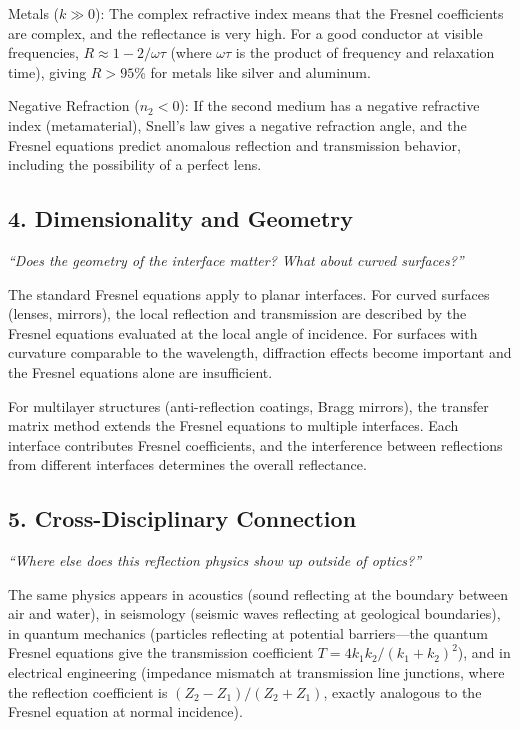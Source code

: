 \documentclass[11pt,openright]{book}
\begin{document}
Metals ($k \gg 0$): The complex refractive index means that the Fresnel coefficients are complex, and the reflectance is very high. For a good conductor at visible frequencies, $R \approx 1 - 2/\omega\tau$ (where $\omega\tau$ is the product of frequency and relaxation time), giving $R > 95\%$ for metals like silver and aluminum.

Negative Refraction ($n_2 < 0$): If the second medium has a negative refractive index (metamaterial), Snell's law gives a negative refraction angle, and the Fresnel equations predict anomalous reflection and transmission behavior, including the possibility of a perfect lens.

\subsection*{4. Dimensionality and Geometry}
\textit{``Does the geometry of the interface matter? What about curved surfaces?''}

The standard Fresnel equations apply to planar interfaces. For curved surfaces (lenses, mirrors), the local reflection and transmission are described by the Fresnel equations evaluated at the local angle of incidence. For surfaces with curvature comparable to the wavelength, diffraction effects become important and the Fresnel equations alone are insufficient.

For multilayer structures (anti-reflection coatings, Bragg mirrors), the transfer matrix method extends the Fresnel equations to multiple interfaces. Each interface contributes Fresnel coefficients, and the interference between reflections from different interfaces determines the overall reflectance.

\subsection*{5. Cross-Disciplinary Connection}
\textit{``Where else does this reflection physics show up outside of optics?''}

The same physics appears in acoustics (sound reflecting at the boundary between air and water), in seismology (seismic waves reflecting at geological boundaries), in quantum mechanics (particles reflecting at potential barriers---the quantum Fresnel equations give the transmission coefficient $T = 4k_1 k_2/(k_1 + k_2)^2$), and in electrical engineering (impedance mismatch at transmission line junctions, where the reflection coefficient is $(Z_2 - Z_1)/(Z_2 + Z_1)$, exactly analogous to the Fresnel equation at normal incidence).
\end{document}
